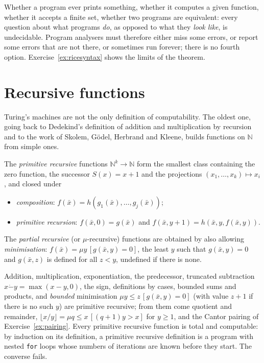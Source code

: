 Whether a program ever prints something, whether it computes a given function, whether it accepts a finite set, whether two programs are equivalent: every question about what programs \emph{do}, as opposed to what they \emph{look like}, is undecidable. Program analysers must therefore either miss some errors, or report some errors that are not there, or sometimes run forever; there is no fourth option. Exercise~\ref{ex:ricesyntax} shows the limits of the theorem.

\section{Recursive functions}\label{sec:recursive}

Turing's machines are not the only definition of computability. The oldest one, going back to Dedekind's definition of addition and multiplication by recursion and to the work of Skolem, Gödel, Herbrand and Kleene, builds functions on $\mathbb N$ from simple ones.

\begin{definition}\label{def:primrec}
The \emph{primitive recursive} functions $\mathbb N^k\to\mathbb N$ form the smallest class containing the zero function, the successor $S(x)=x+1$ and the projections $(x_1,\dots,x_k)\mapsto x_i$, and closed under
\begin{itemize}
\item \emph{composition}: $f(\bar x)=h(g_1(\bar x),\dots,g_j(\bar x))$;
\item \emph{primitive recursion}: $f(\bar x,0)=g(\bar x)$ and $f(\bar x,y+1)=h(\bar x,y,f(\bar x,y))$.
\end{itemize}
The \emph{partial recursive} (or $\mu$-recursive) functions are obtained by also allowing \emph{minimisation}: $f(\bar x)=\mu y\,[g(\bar x,y)=0]$, the least $y$ such that $g(\bar x,y)=0$ and $g(\bar x,z)$ is defined for all $z<y$, undefined if there is none.
\end{definition}

Addition, multiplication, exponentiation, the predecessor, truncated subtraction $x\mathbin{\dot-}y=\max(x-y,0)$, the sign, definitions by cases, bounded sums and products, and \emph{bounded} minimisation $\mu y\le z\,[g(\bar x,y)=0]$ (with value $z+1$ if there is no such $y$) are primitive recursive; from them come quotient and remainder, $\lfloor x/y\rfloor=\mu q\le x\,[(q+1)y>x]$ for $y\ge1$, and the Cantor pairing of Exercise~\ref{ex:pairing}. Every primitive recursive function is total and computable: by induction on its definition, a primitive recursive definition is a program with nested \texttt{for} loops whose numbers of iterations are known before they start. The converse fails.

